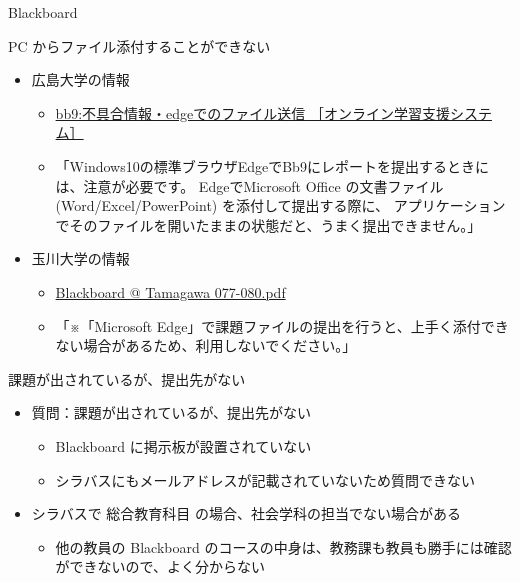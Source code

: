 \documentclass[a4j,10pt]{jsarticle}
\begin{document}
{\begin{frame}[label={sec:org166405d},fragile]{Blackboard}
\begin{block}{PC からファイル添付することができない}
\begin{itemize}
\begin{itemize}
\item \url{https://www.mozilla.org/ja/firefox/new/}
\end{itemize}
\par
\item 広島大学の情報
\begin{itemize}
\item \href{https://support.vle.hiroshima-u.ac.jp/bb9:\%E4\%B8\%8D\%E5\%85\%B7\%E5\%90\%88\%E6\%83\%85\%E5\%A0\%B1\%E3\%83\%BBedge\%E3\%81\%A7\%E3\%81\%AE\%E3\%83\%95\%E3\%82\%A1\%E3\%82\%A4\%E3\%83\%AB\%E9\%80\%81\%E4\%BF\%A1}{bb9:不具合情報・edgeでのファイル送信 ［オンライン学習支援システム］}
\item 「Windows10の標準ブラウザEdgeでBb9にレポートを提出するときには、注意が必要です。
EdgeでMicrosoft Office の文書ファイル (Word/Excel/PowerPoint) を添付して提出する際に、
アプリケーションでそのファイルを開いたままの状態だと、うまく提出できません。」
\end{itemize}
\end{itemize}
\par
\begin{itemize}
\item 玉川大学の情報
\begin{itemize}
\item \href{https://www.tamagawa.ac.jp/student\_guidebook/2020/pdf/03/077-080.pdf}{Blackboard @ Tamagawa 077-080.pdf}
\item 「※「Microsoft Edge」で課題ファイルの提出を行うと、上手く添付できない場合があるため、利用しないでください。」
\end{itemize}
\end{itemize}
\end{block}
\par
\begin{block}{課題が出されているが、提出先がない}
\begin{itemize}
\item 質問：課題が出されているが、提出先がない
\begin{itemize}
\item Blackboard に掲示板が設置されていない
\item シラバスにもメールアドレスが記載されていないため質問できない
\end{itemize}
\par
\item シラバスで \alert{総合教育科目} の場合、社会学科の担当でない場合がある
\begin{itemize}
\item 他の教員の Blackboard のコースの中身は、教務課も教員も勝手には確認ができないので、よく分からない

\end{itemize}
\end{itemize}
\end{block}
\end{frame}}
\end{document}
